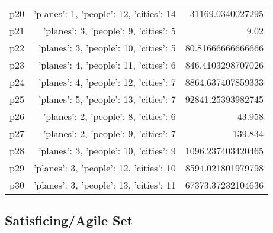 \documentclass{article}
\begin{document}
\begin{center}
\begin{tabular}{r|r|r}
  p20&{'planes': 1, 'people': 12, 'cities': 14}&31169.0340027295\\
  p21&{'planes': 3, 'people': 9, 'cities': 5}&9.02\\
  p22&{'planes': 3, 'people': 10, 'cities': 5}&80.81666666666666\\
  p23&{'planes': 4, 'people': 11, 'cities': 6}&846.4103298707026\\
  p24&{'planes': 4, 'people': 12, 'cities': 7}&8864.637407859333\\
  p25&{'planes': 5, 'people': 13, 'cities': 7}&92841.25393982745\\
  p26&{'planes': 2, 'people': 8, 'cities': 6}&43.958\\
  p27&{'planes': 2, 'people': 9, 'cities': 7}&139.834\\
  p28&{'planes': 3, 'people': 10, 'cities': 9}&1096.237403420465\\
  p29&{'planes': 3, 'people': 12, 'cities': 10}&8594.021801979798\\
  p30&{'planes': 3, 'people': 13, 'cities': 11}&67373.37232104636
                            \end{tabular}
                            \end{center}
                    

                                \subsection*{Satisficing/Agile Set}
                                
\end{document}
